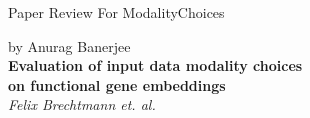 \begin{center}
        
    \Large{Paper Review For ModalityChoices} \\
    \author{}{by Anurag Banerjee}\\
    
    \vspace{1em}
    \LARGE{\textbf{Evaluation of input data modality choices\\on functional gene
    embeddings}\cite{modalityChoices}} \\
    \Large{\textit{Felix Brechtmann et. al.}} \\

\end{center}